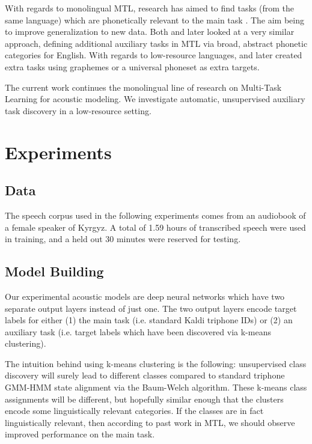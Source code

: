 \documentclass[a4paper]{article}
\begin{document}
With regards to monolingual MTL, research has aimed to find tasks (from the same language) which are phonetically relevant to the main task \cite{bell2015}. The aim being to improve generalization to new data. Both \cite{seltzer2013} and later \cite{huang2015} looked at a very similar approach, defining additional auxiliary tasks in MTL via broad, abstract phonetic categories for English. With regards to low-resource languages, \cite{chen2014} and later \cite{chen2015} created extra tasks using graphemes or a universal phoneset as extra targets.

The current work continues the monolingual line of research on Multi-Task Learning for acoustic modeling. We investigate automatic, unsupervised auxiliary task discovery in a low-resource setting.


\section{Experiments}


\subsection{Data}

The speech corpus used in the following experiments comes from an audiobook of a female speaker of Kyrgyz. A total of 1.59 hours of transcribed speech were used in training, and a held out 30 minutes were reserved for testing.


\subsection{Model Building}

Our experimental acoustic models are deep neural networks which have two separate output layers instead of just one. The two output layers encode target labels for either (1) the main task (i.e. standard Kaldi triphone IDs) or (2) an auxiliary task (i.e. target labels which have been discovered via k-means clustering).

The intuition behind using k-means clustering is the following: unsupervised class discovery will surely lead to different classes compared to standard triphone GMM-HMM state alignment via the Baum-Welch algorithm. These k-means class assignments will be different, but hopefully similar enough that the clusters encode some linguistically relevant categories. If the classes are in fact linguistically relevant, then according to past work in MTL, we should observe improved performance on the main task.
\end{document}
